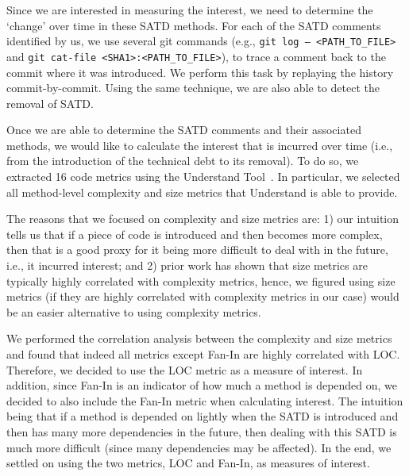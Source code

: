Since we are interested in measuring the interest, we need to determine the `change' over time in these SATD methods. For each of the SATD comments identified by us, we use several git commands (e.g., {\tt git log -- <PATH\_TO\_FILE>} and {\tt git cat-file <SHA1>:<PATH\_TO\_FILE>}), to trace a comment back to the commit where it was introduced. We perform this task by replaying the history commit-by-commit. Using the same technique, we are also able to detect the removal of SATD.


Once we are able to determine the SATD comments and their associated methods, we would like to calculate the interest that is incurred over time (i.e., from the introduction of the technical debt to its removal). To do so, we extracted 16 code metrics using the {\sc Understand Tool}~\cite{Understand}. In particular, we selected all method-level complexity and size metrics that Understand is able to provide.

The reasons that we focused on complexity and size metrics are: 1) our intuition tells us that if a piece of code is introduced and then becomes more complex, then that is a good proxy for it being more difficult to deal with in the future, i.e., it incurred interest; and 2) prior work has shown that size metrics are typically highly correlated with complexity metrics, hence, we figured using size metrics (if they are highly correlated with complexity metrics in our case) would be an easier alternative to using complexity metrics.

We performed the correlation analysis between the complexity and size metrics and found that indeed all metrics except Fan-In are highly correlated with LOC. Therefore, we decided to use the LOC metric as a measure of interest. In addition, since Fan-In is an indicator of how much a method is depended on, we decided to also include the Fan-In metric when calculating interest. The intuition being that if a method is depended on lightly when the SATD is introduced and then has many more dependencies in the future, then dealing with this SATD is much more difficult (since many dependencies may be affected). In the end, we settled on using the two metrics, LOC and Fan-In, as measures of interest.

